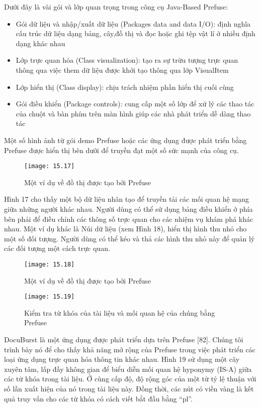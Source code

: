 \documentclass[13pt]{scrartcl} %
\begin{document}
Dưới đây là vài gói và lớp quan trọng trong công cụ Java-Based Prefuse:

\begin{itemize}

    \item Gói dữ liệu và nhập/xuất dữ liệu (Packages data and data I/O): định nghĩa cấu trúc dữ liệu dạng bảng, cây,đồ thị và đọc hoặc ghi tệp vật lí ở nhiều định dạng khác nhau
    \item Lớp trực quan hóa (Class visualization): tạo ra sự trừu tượng trực quan thông qua việc them dữ liệu được khởi tạo thông qua lớp VisualItem
    \item Lớp hiển thị (Class display): chịu trách nhiệm phần hiển thị cuối cùng
    \item Gói điều khiển (Package controls): cung cấp một số lớp để xử lý các thao tác của chuột và bàn phím trên màn hình giúp các nhà phát triển dễ dàng thao tác
\end{itemize}

Một số hình ảnh từ gói demo Prefuse hoặc các ứng dụng được phát triển bằng Prefuse được hiển thị bên dưới để truyền đạt một số sức mạnh của công cụ.

\begin{figure}[!ht]
    \centering
    \texttt{[image: 15.17]}
    \caption{Một ví dụ về đồ thị được tạo bởi Prefuse}
\end{figure}

Hình 17 cho thấy một bộ dữ liệu nhân tạo để truyền tải các mối quan hệ mạng giữa những người khác nhau. Người dùng có thể sử dụng bảng điều khiển ở phía bên phải để điều chỉnh các thông số trực quan cho các nhiệm vụ khám phá khác nhau. Một ví dụ khác là Núi dữ liệu (xem Hình 18), hiển thị hình thu nhỏ cho một số đối tượng. Người dùng có thể kéo và thả các hình thu nhỏ này để quản lý các đối tượng một cách trực quan.

\begin{figure}[!ht]
    \centering
    \texttt{[image: 15.18]}
    \caption{Một ví dụ về đồ thị được tạo bởi Prefuse}
\end{figure}

\begin{figure}[!ht]
    \centering
    \texttt{[image: 15.19]}
    \caption{Kiểm tra từ khóa của tài liệu và mối quan hệ của chúng bằng Prefuse}
\end{figure}

DocuBurst là một ứng dụng được phát triển dựa trên Prefuse [82]. Chúng tôi trình bày nó để cho thấy khả năng mở rộng của Prefuse trong việc phát triển các loại ứng dụng trực quan hóa thông tin khác nhau. Hình 19 sử dụng một cây xuyên tâm, lấp đầy không gian để biểu diễn mối quan hệ hyponymy (IS-A) giữa các từ khóa trong tài liệu. Ở cùng cấp độ, độ rộng góc của một từ tỷ lệ thuận với số lần xuất hiện của nó trong tài liệu này. Đồng thời, các nút có viền vàng là kết quả truy vấn cho các từ khóa có cách viết bắt đầu bằng “pl”.
\end{document}
